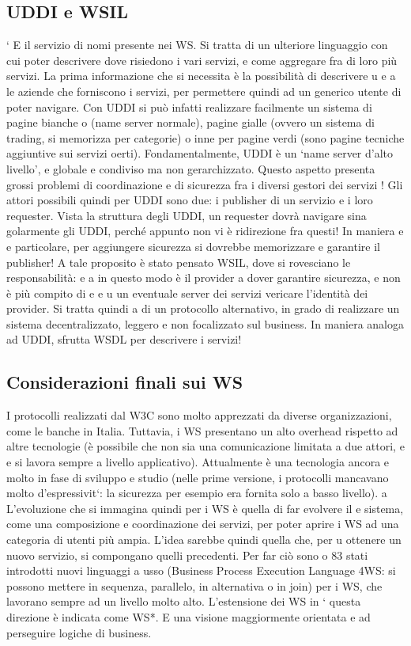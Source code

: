 \documentclass[a4paper,12pt]{article}
\begin{document}
\subsection{UDDI e WSIL}
`
E il servizio di nomi presente nei WS. Si tratta di un ulteriore linguaggio con
cui poter descrivere dove risiedono i vari servizi, e come aggregare fra di loro
più servizi. La prima informazione che si necessita è la possibilità di descrivere
u
e
a
le aziende che forniscono i servizi, per permettere quindi ad un generico utente
di poter navigare.
Con UDDI si può infatti realizzare facilmente un sistema di pagine bianche
o
(name server normale), pagine gialle (ovvero un sistema di trading, si memorizza per categorie) o inne per pagine verdi
(sono pagine tecniche aggiuntive
sui servizi oerti). Fondamentalmente, UDDI è un {`}name server d'alto livello',
e
globale e condiviso ma non gerarchizzato. Questo aspetto presenta grossi problemi di coordinazione e di sicurezza fra i
diversi gestori dei servizi !
Gli attori possibili quindi per UDDI sono due: i publisher di un servizio e i
loro requester. Vista la struttura degli UDDI, un requester dovrà navigare sina
golarmente gli UDDI, perché appunto non vi è ridirezione fra questi! In maniera
e
e
particolare, per aggiungere sicurezza si dovrebbe memorizzare e garantire il publisher!
A tale proposito è stato pensato WSIL, dove si rovesciano le responsabilità:
e
a
in questo modo è il provider a dover garantire sicurezza, e non è più compito di
e
e u
un eventuale server dei servizi vericare l'identità dei provider. Si tratta quindi
a
di un protocollo alternativo, in grado di realizzare un sistema decentralizzato,
leggero e non focalizzato sul business. In maniera analoga ad UDDI, sfrutta
WSDL per descrivere i servizi!
\subsection{Considerazioni finali sui WS}
I protocolli realizzati dal W3C sono molto apprezzati da diverse organizzazioni,
come le banche in Italia. Tuttavia, i WS presentano un alto overhead rispetto ad
altre tecnologie (è possibile che non sia una comunicazione limitata a due attori,
e
e si lavora sempre a livello applicativo). Attualmente è una tecnologia ancora
e
molto in fase di sviluppo e studio (nelle prime versione, i protocolli mancavano
molto d'espressivit`: la sicurezza per esempio era fornita solo a basso livello).
a
L'evoluzione che si immagina quindi per i WS è quella di far evolvere il
e
sistema, come una composizione e coordinazione dei servizi, per poter aprire i
WS ad una categoria di utenti più ampia. L'idea sarebbe quindi quella che, per
u
ottenere un nuovo servizio, si compongano quelli precedenti. Per far ciò sono
o
83
stati introdotti nuovi linguaggi a usso (Business Process Execution Language
4WS: si possono mettere in sequenza, parallelo, in alternativa o in join) per
i WS, che lavorano sempre ad un livello molto alto. L'estensione dei WS in
`
questa direzione è indicata come WS*. E una visione maggiormente orientata
e
ad perseguire logiche di business.
\end{document}
